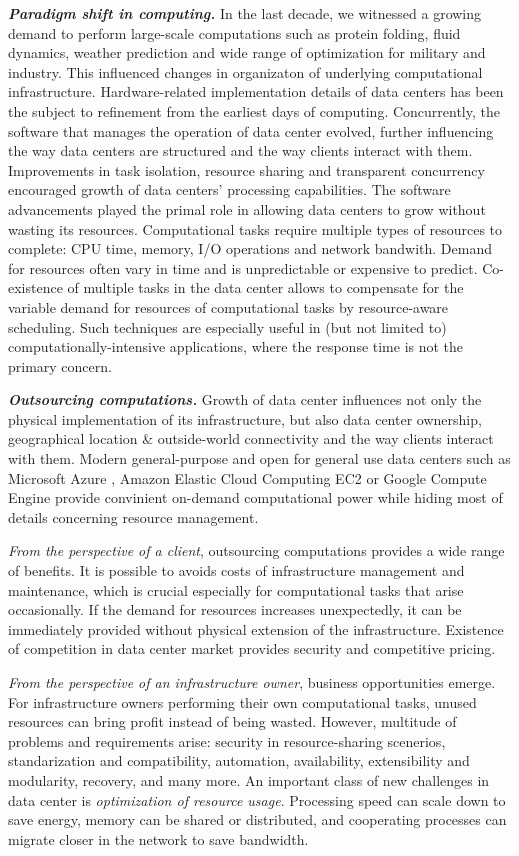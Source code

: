\indent\textbf{\emph{Paradigm shift in computing.}}
In the last decade, we witnessed a growing demand to perform large-scale computations 
such as protein folding, fluid dynamics, weather prediction and wide range of optimization for military and industry.
This influenced changes in organizaton of underlying computational infrastructure.
Hardware-related implementation details of data centers has been the subject to refinement from the earliest days of computing.
Concurrently, the software that manages the operation of data center evolved, further influencing the way data centers are structured and the way clients interact with them.
Improvements in task isolation, resource sharing and transparent concurrency encouraged growth of data centers' processing capabilities.
The software advancements played the primal role in allowing data centers to grow without wasting its resources.
Computational tasks require multiple types of resources to complete: CPU time, memory, I/O operations and network bandwith.
Demand for resources often vary in time and is unpredictable or expensive to predict.
Co-existence of multiple tasks in the data center allows to compensate for the variable demand for resources of computational tasks by resource-aware scheduling.
Such techniques are especially useful in (but not limited to) computationally-intensive applications, where the response time is not the primary concern.

\textbf{\emph{Outsourcing computations.}}
Growth of data center influences not only the physical implementation of its infrastructure, but also data center ownership, geographical location \& outside-world connectivity and the way clients interact with them.
Modern general-purpose and open for general use data centers such as Microsoft Azure \cite{url-azure}, Amazon Elastic Cloud Computing EC2 \cite{url-amazon-ec2} or Google Compute Engine \cite{url-gce} provide convinient on-demand computational power while hiding most of details concerning resource management.

\emph{From the perspective of a client}, outsourcing computations provides a wide range of benefits.
It is possible to avoids costs of infrastructure management and maintenance, which is crucial especially for computational tasks that arise occasionally.
If the demand for resources increases unexpectedly, it can be immediately provided without physical extension of the infrastructure.
Existence of competition in data center market provides security and competitive pricing.

\emph{From the perspective of an infrastructure owner}, business opportunities emerge.
For infrastructure owners performing their own computational tasks, unused resources can bring profit instead of being wasted.
However, multitude of problems and requirements arise: security in resource-sharing scenerios, standarization and compatibility, automation, availability, extensibility and modularity, recovery, and many more.
An important class of new challenges in data center is \emph{optimization of resource usage}.
Processing speed can scale down to save energy, memory can be shared or distributed, and cooperating processes can migrate closer in the network to save bandwidth.


